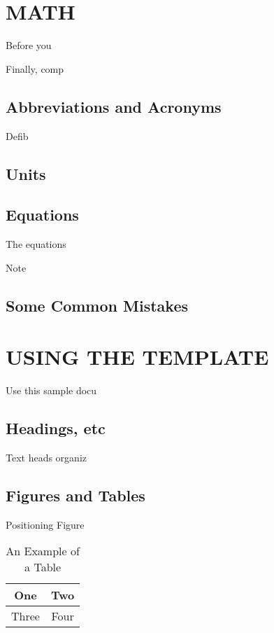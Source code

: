 \documentclass[letterpaper, 10 pt, conference]{ieeeconf}  %
\begin{document}
\section{MATH}

Before you




Finally, comp

\subsection{Abbreviations and Acronyms}
Defib

\subsection{Units}



\subsection{Equations}

The equations



Note

\subsection{Some Common Mistakes}

\section{USING THE TEMPLATE}

Use this sample docu

\subsection{Headings, etc}

Text heads organiz

\subsection{Figures and Tables}

Positioning Figure



\begin{table}[h]
\caption{An Example of a Table}
\label{table_example}
\begin{center}
\begin{tabular}{|c||c|}
\hline
One & Two\\
\hline
Three & Four\\
\hline
\end{tabular}
\end{center}
\end{table}
\end{document}
